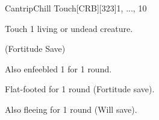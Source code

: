 
\begin{card-collection}{Cantrip}{\level}{Chill Touch}[CRB][323]{\level}{1, ..., 10}



Touch 1 living or undead creature.


 (Fortitude Save)

 Also enfeebled 1 for 1 round.


Flat-footed for 1 round (Fortitude save).

 Also fleeing for 1 round (Will save).
\end{card-collection}%